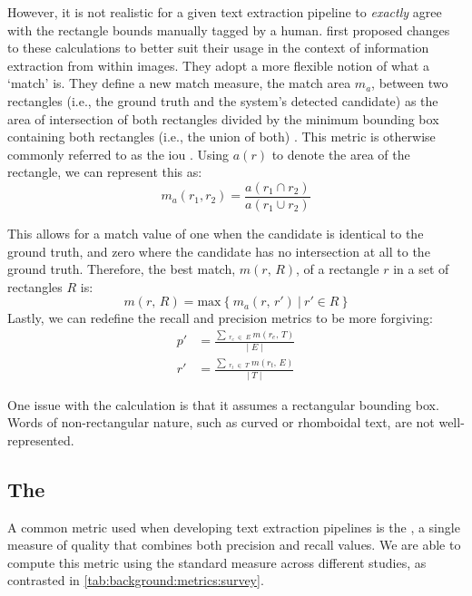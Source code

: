 However, it is not realistic for a given text extraction pipeline to \textit{exactly} agree with the rectangle bounds manually tagged by a human. \citet{Lucas:2003iw} first proposed changes to these calculations to better suit their usage in the context of information extraction from within images. They adopt a more flexible notion of what a `match' is. They define a new match measure, the match area $m_{a}$, between two rectangles (i.e., the ground truth and the system's detected candidate) as the area of intersection of both rectangles divided by the minimum bounding box containing both rectangles (i.e., the union of both) \citep{Lucas:2003iw, Lucas:2005bq, Lucas:2005hl}. This metric is otherwise commonly referred to as the \gls{iou} \citep{Karatzas:2015tj,Lin:2014vma,Jaderberg:2016wj}. Using $a(r)$ to denote the area of the rectangle, we can represent this as:
\begin{equation*}
  m_{a}(r_{1}, r_{2}) = \frac{a(r_{1} \cap r_{2})}{a(r_{1} \cup r_{2})}
\end{equation*}

This allows for a match value of one when the candidate is identical to the ground truth, and zero where the candidate has no intersection at all to the ground truth. Therefore, the best match, $m(r,\,R)$, of a rectangle $r$ in a set of rectangles $R$ is:
\begin{equation*}
  m(r,\,R) = \mathrm{max}~\{~m_{a}(r,\,r')~|~r' \in R~\}
\end{equation*}
\noindent
Lastly, we can redefine the recall and precision metrics to be more forgiving:
\begin{align*}
  p' &= \frac{\sum\,_{r_{e}\;\in\;E}~m(r_{e},\,T)}{\lvert\;E\;\rvert}\\
  r' &= \frac{\sum\,_{r_{t}\;\in\;T}~m(r_{t},\,E)}{\lvert\;T\;\rvert}
\end{align*}

One issue with the calculation is that it assumes a rectangular bounding box. Words of non-rectangular nature, such as curved or rhomboidal text, are not well-represented.

\subsection{The \fscore}
\label{sec:background:metrics:fscore}

A common metric used when developing text extraction pipelines is the \fscore, a single measure of quality that combines both precision and recall values. We are able to compute this metric using the standard measure across different studies, as contrasted in \cref{tab:background:metrics:survey}.

